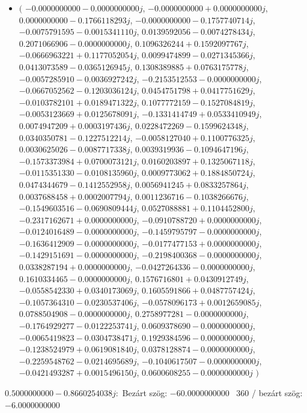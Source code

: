 \documentclass[14pt,a4paper]{article}
\begin{document}
\begin{itemize}
\item
$\big($
$-0.0000000000-0.0000000000j$, $-0.0000000000+0.0000000000j$, $0.0000000000-0.1766118293j$, $-0.0000000000-0.1757740714j$, $-0.0075791595-0.0015341110j$, $0.0139592056-0.0074278434j$, $0.2071066906-0.0000000000j$, $0.1096326244+0.1592097767j$, $-0.0666963221+0.1177052054j$, $0.0099474899-0.0271345366j$, $0.0413073589-0.0365126945j$, $0.1308389885+0.0763175778j$, $-0.0057285910-0.0036927242j$, $-0.2153512553-0.0000000000j$, $-0.0667052562-0.1203036124j$, $0.0454751798+0.0417751629j$, $-0.0103782101+0.0189471322j$, $0.1077772159-0.1527084819j$, $-0.0053123669+0.0125678091j$, $-0.1331414749+0.0533410949j$, $0.0074947209+0.0003197436j$, $0.0228472269-0.1599624348j$, $0.0340350781-0.1227512214j$, $-0.0058127040+0.1100776325j$, $0.0030625026-0.0087717338j$, $0.0039319936-0.1094647196j$, $-0.1573373984+0.0700073121j$, $0.0160203897+0.1325067118j$, $-0.0115351330-0.0108135960j$, $0.0009773062+0.1884850724j$, $0.0474344679-0.1412552958j$, $0.0056941245+0.0833257864j$, $0.0037688458+0.0002007794j$, $0.0011236716-0.1038266676j$, $-0.1549603516-0.0690809444j$, $0.0527088881+0.1104452800j$, $-0.2317162671+0.0000000000j$, $-0.0910788720+0.0000000000j$, $-0.0124016489-0.0000000000j$, $-0.1459795797-0.0000000000j$, $-0.1636412909-0.0000000000j$, $-0.0177477153+0.0000000000j$, $-0.1429151691-0.0000000000j$, $-0.2198400368-0.0000000000j$, $0.0338287194+0.0000000000j$, $-0.0427264336-0.0000000000j$, $0.1610334465-0.0000000000j$, $0.1576716801+0.0430912749j$, $-0.0558542330+0.0340173069j$, $0.1605591866+0.0487757424j$, $-0.1057364310-0.0230537406j$, $-0.0578096173+0.0012659085j$, $0.0788504908-0.0000000000j$, $0.2758977281-0.0000000000j$, $-0.1764929277-0.0122253741j$, $0.0609378690-0.0000000000j$, $-0.0065419823-0.0304738471j$, $0.1929384596-0.0000000000j$, $-0.1238524979+0.0619081840j$, $0.0378128874-0.0000000000j$, $-0.2259548762-0.0214695689j$, $-0.1040617507-0.0000000000j$, $-0.0421493287+0.0015496150j$, $0.0600608255-0.0000000000j$
$\big)$
\end{itemize}
$0.5000000000-0.8660254038j$:\
Bezárt szög: $-60.0000000000$ \
360 / bezárt szög: $-6.0000000000$\
\end{document}
